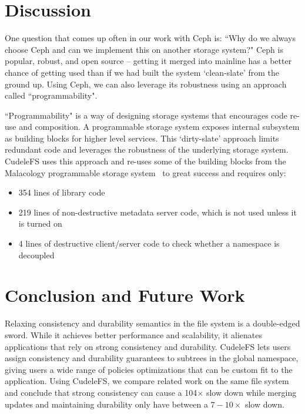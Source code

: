 \section{Discussion}

One question that comes up often in our work with Ceph is: ``Why do we always
choose Ceph and can we implement this on another storage system?" Ceph is
popular, robust, and open source -- getting it merged into mainline has a
better chance of getting used than if we had built the system `clean-slate'
from the ground up. Using Ceph, we can also leverage its robustness using an
approach called ``programmability".

``Programmability" is a way of designing storage systems that encourages code
re-use and composition.  A programmable storage system exposes internal
subsystem as building blocks for higher level services. This `dirty-slate'
approach limits redundant code and leverages the robustness of the underlying
storage system. CudeleFS uses this approach and re-uses some of the building
blocks from the Malacology programmable storage system~\cite{sevilla:eurosys17}
to great success and requires only:

\begin{itemize}

  \item 354 lines of library code

  \item 219 lines of non-destructive metadata server code, which is not used
  unless it is turned on

  \item 4 lines of destructive client/server code to check whether a namespace
  is decoupled

\end{itemize}

\section{Conclusion and Future Work}

Relaxing consistency and durability semantics in the file system is a
double-edged sword. While it achieves better performance and scalability, it
alienates applications that rely on strong consistency and durability. CudeleFS
lets users assign consistency and durability guarantees to subtrees in
the global namespace, giving users a wide range of policies
optimizations that can be custom fit to the application. Using CudeleFS, we
compare related work on the same file system and conclude that strong
consistency can cause a 104\(\times\) slow down while merging updates and
maintaining durability only have between a \(7-10\times\) slow down.



